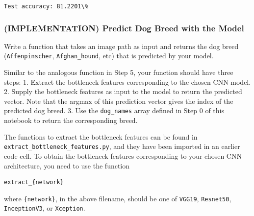 \documentclass[11pt]{article}
\begin{document}
    \begin{Verbatim}[commandchars=\\\{\}]
Test accuracy: 81.2201\%

    \end{Verbatim}

    \subsubsection{(IMPLEMENTATION) Predict Dog Breed with the
Model}\label{implementation-predict-dog-breed-with-the-model}

Write a function that takes an image path as input and returns the dog
breed (\texttt{Affenpinscher}, \texttt{Afghan\_hound}, etc) that is
predicted by your model.

Similar to the analogous function in Step 5, your function should have
three steps: 1. Extract the bottleneck features corresponding to the
chosen CNN model. 2. Supply the bottleneck features as input to the
model to return the predicted vector. Note that the argmax of this
prediction vector gives the index of the predicted dog breed. 3. Use the
\texttt{dog\_names} array defined in Step 0 of this notebook to return
the corresponding breed.

The functions to extract the bottleneck features can be found in
\texttt{extract\_bottleneck\_features.py}, and they have been imported
in an earlier code cell. To obtain the bottleneck features corresponding
to your chosen CNN architecture, you need to use the function

\begin{verbatim}
extract_{network}
\end{verbatim}

where \texttt{\{network\}}, in the above filename, should be one of
\texttt{VGG19}, \texttt{Resnet50}, \texttt{InceptionV3}, or
\texttt{Xception}.
\end{document}
